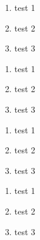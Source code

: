 \documentclass[12pt,twoside]{report}
\begin{document}
\lipsum[1][1-3]
\begin{enumerate}
    \item test 1 
    \item test 2
    \item test 3
\end{enumerate}
\lipsum[1][1-3]

\lipsum[1][1-3]
\begin{enumerate}
    \item test 1 
    \item test 2
    \item test 3
\end{enumerate}
\lipsum[1][1-3]
\newpage
{}
\setlength{\parskip}{8pt plus 3pt minus3pt } 
\selectfont
{}

\lipsum[1][1-3]
\begin{enumerate}
    \item test 1 
    \item test 2
    \item test 3
\end{enumerate}
\lipsum[1][1-3]

\lipsum[1][1-3]
\begin{enumerate}
    \item test 1 
    \item test 2
    \item test 3
\end{enumerate}
\lipsum[1][1-3]
\end{document}
